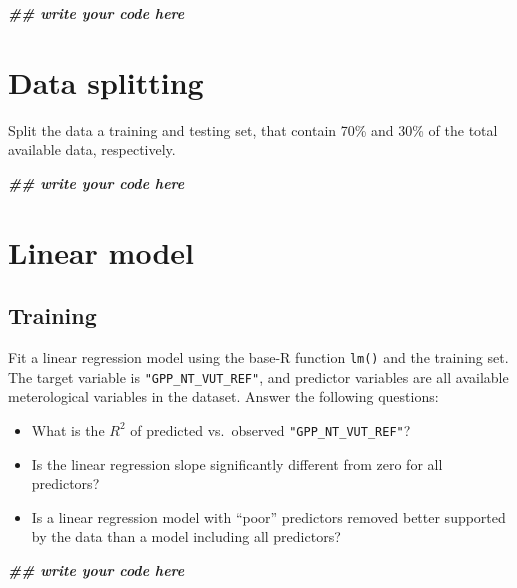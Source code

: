 \documentclass[
]{book}
\newenvironment{Shaded}{\begin{snugshade}}{\end{snugshade}}
\newcommand{\DocumentationTok}[1]{\textcolor[rgb]{0.56,0.35,0.01}{\textbf{\textit{#1}}}}
\providecommand{\tightlist}{%
  \setlength{\itemsep}{0pt}\setlength{\parskip}{0pt}}
\begin{document}
\begin{Shaded}
\begin{Highlighting}[]
\DocumentationTok{\#\# write your code here}
\end{Highlighting}
\end{Shaded}

\hypertarget{data-splitting-1}{%
\section{Data splitting}\label{data-splitting-1}}

Split the data a training and testing set, that contain 70\% and 30\% of the total available data, respectively.

\begin{Shaded}
\begin{Highlighting}[]
\DocumentationTok{\#\# write your code here}
\end{Highlighting}
\end{Shaded}

\hypertarget{linear-model}{%
\section{Linear model}\label{linear-model}}

\hypertarget{training-1}{%
\subsection{Training}\label{training-1}}

Fit a linear regression model using the base-R function \texttt{lm()} and the training set. The target variable is \texttt{"GPP\_NT\_VUT\_REF"}, and predictor variables are all available meterological variables in the dataset. Answer the following questions:

\begin{itemize}
\tightlist
\item
  What is the \(R^2\) of predicted vs.~observed \texttt{"GPP\_NT\_VUT\_REF"}?
\item
  Is the linear regression slope significantly different from zero for all predictors?
\item
  Is a linear regression model with ``poor'' predictors removed better supported by the data than a model including all predictors?
\end{itemize}

\begin{Shaded}
\begin{Highlighting}[]
\DocumentationTok{\#\# write your code here}
\end{Highlighting}
\end{Shaded}
\end{document}
